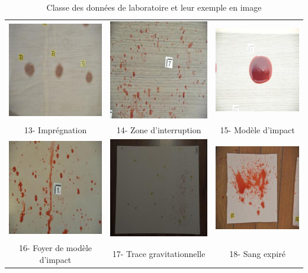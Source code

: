 \documentclass[a4paper]{article}
\begin{document}
\begin{appendices}
\begin{table}[H]
\begin{tabular}{ccc}
        \includegraphics[width=0.20\linewidth]{../asset/data_labo/13_carrelage_7374.jpg} & \includegraphics[width=0.20\linewidth]{../asset/data_labo/14_lino_6320.jpg} & \includegraphics[width=0.20\linewidth]{../asset/data_labo/15_p1040.jpg} \\
        13- Imprégnation & 14- Zone d'interruption & 15- Modèle d'impact \\
        \includegraphics[width=0.20\linewidth]{../asset/data_labo/16_carrelage_598.jpg} & \includegraphics[width=0.20\linewidth]{../asset/data_labo/17_papier_8323.jpg} & \includegraphics[width=0.20\linewidth]{../asset/data_labo/18_bois_4727.jpg}\\
        16- Foyer de modèle d'impact & 17- Trace gravitationnelle & 18- Sang expiré \\
    \end{tabular}
    \caption{Classe des données de laboratoire et leur exemple en image}
    \label{tab: images of all classes}
\end{table}


\end{appendices}
\end{document}
